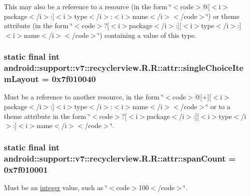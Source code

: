 This may also be a reference to a resource (in the form \char`\"{}$<$code$>$@\mbox{[}$<$i$>$package$<$/i$>$:\mbox{]}$<$i$>$type$<$/i$>$:$<$i$>$name$<$/i$>$$<$/code$>$\char`\"{}) or theme attribute (in the form \char`\"{}$<$code$>$?\mbox{[}$<$i$>$package$<$/i$>$:\mbox{]}\mbox{[}$<$i$>$type$<$/i$>$:\mbox{]}$<$i$>$name$<$/i$>$$<$/code$>$\char`\"{}) containing a value of this type. \hypertarget{classandroid_1_1support_1_1v7_1_1recyclerview_1_1_r_1_1attr_3668a9127cf32623817179d35f58f1b5}{
\subsubsection[{singleChoiceItemLayout}]{\setlength{\rightskip}{0pt plus 5cm}static final int android::support::v7::recyclerview.R.R::attr::singleChoiceItemLayout = 0x7f010040}}
\label{classandroid_1_1support_1_1v7_1_1recyclerview_1_1_r_1_1attr_3668a9127cf32623817179d35f58f1b5}


Must be a reference to another resource, in the form \char`\"{}$<$code$>$@\mbox{[}+\mbox{]}\mbox{[}$<$i$>$package$<$/i$>$:\mbox{]}$<$i$>$type$<$/i$>$:$<$i$>$name$<$/i$>$$<$/code$>$\char`\"{} or to a theme attribute in the form \char`\"{}$<$code$>$?\mbox{[}$<$i$>$package$<$/i$>$:\mbox{]}\mbox{[}$<$i$>$type$<$/i$>$:\mbox{]}$<$i$>$name$<$/i$>$$<$/code$>$\char`\"{}. \hypertarget{classandroid_1_1support_1_1v7_1_1recyclerview_1_1_r_1_1attr_4bcb72056cb55ba5a2d95cb14c6bd950}{
\subsubsection[{spanCount}]{\setlength{\rightskip}{0pt plus 5cm}static final int android::support::v7::recyclerview.R.R::attr::spanCount = 0x7f010001}}
\label{classandroid_1_1support_1_1v7_1_1recyclerview_1_1_r_1_1attr_4bcb72056cb55ba5a2d95cb14c6bd950}


Must be an \hyperlink{classandroid_1_1support_1_1v7_1_1recyclerview_1_1_r_1_1integer}{integer} value, such as \char`\"{}$<$code$>$100$<$/code$>$\char`\"{}. 

